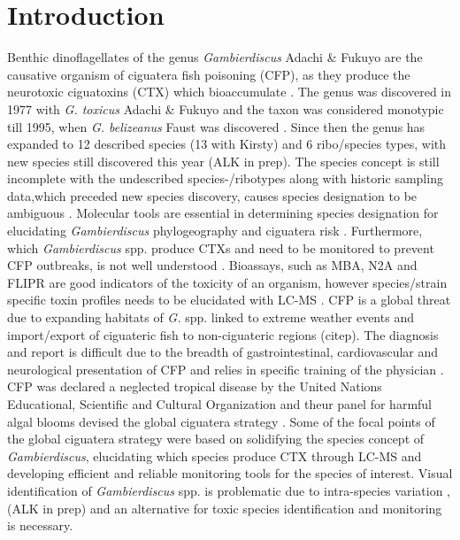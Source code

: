 \documentclass[12pt]{article}
\begin{document}
\section{Introduction}
Benthic dinoflagellates of the genus \emph{Gambierdiscus} Adachi \& Fukuyo are the causative organism of ciguatera fish poisoning (CFP), as they produce the neurotoxic ciguatoxins (CTX) which bioaccumulate \citep{chinain1997intraspecific,holmes1998gambierdiscus}. The genus was discovered in 1977 with \emph{G. toxicus} Adachi \& Fukuyo \citep{adachi1979thecal} and the taxon was considered monotypic till 1995, when \emph{G. belizeanus} Faust was discovered \citep{faust1995observation}. Since then the genus has expanded to 12 described species (13 with Kirsty) and 6 ribo/species types, with new species still discovered this year \citep{litaker2010global,adachi1979thecal,faust1995observation,chinain1999morphology,litaker2009taxonomy,nishimura2014morphology,fraga2011gambierdiscus,xu2014distribution,fraga2014genus} (ALK in prep). The species concept is still incomplete with the undescribed species-/ribotypes along with historic sampling data,which preceded new species discovery, causes species designation to be ambiguous \citep{berdalet2012global,nishimura2014morphology}. Molecular tools are essential in determining species designation for elucidating \emph{Gambierdiscus} phylogeography and ciguatera risk \citep{litaker2010global}. Furthermore, which \emph{Gambierdiscus} spp. produce CTXs and need to be monitored to prevent CFP outbreaks, is not well understood \citep{globalcig}. Bioassays, such as MBA, N2A and FLIPR are good indicators of the toxicity of an organism, however species/strain specific toxin profiles needs to be elucidated with LC-MS \citep{diogened2014chemistry}.
CFP is a global threat due to expanding habitats of \emph{G.} spp. linked to extreme weather events and import/export of ciguateric fish to non-ciguateric regions (citep). The diagnosis and report is difficult due to the breadth of gastrointestinal, cardiovascular and neurological presentation of CFP and relies in specific training of the physician \citep{sims1987theoretical}. CFP was declared a neglected tropical disease by the United Nations Educational, Scientific and Cultural Organization and theur panel for harmful algal blooms devised the global ciguatera strategy \citep{globalcig}. Some of the focal points of the global ciguatera strategy were based on solidifying the species concept of \emph{Gambierdiscus}, elucidating which species produce CTX through LC-MS and developing efficient and reliable monitoring tools for the species of interest. Visual identification of \emph{Gambierdiscus} spp. is problematic due to intra-species variation \citep{kohli2014high}, (ALK in prep) and an alternative for toxic species identification and monitoring is necessary.
\end{document}

